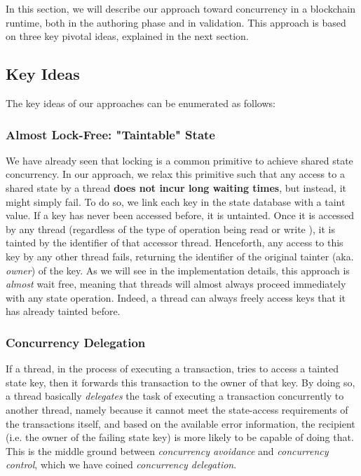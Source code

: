 In this section, we will describe our approach toward concurrency in a blockchain runtime, both in
the authoring phase and in validation. This approach is based on three key pivotal ideas, explained
in the next section.

\subsection{Key Ideas}

The key ideas of our approaches can be enumerated as follows:

\subsubsection{Almost Lock-Free: "Taintable" State}\label{chapt_approach:subsubsec:taintable_state}

We have already seen that locking is a common primitive to achieve shared state concurrency. In our
approach, we relax this primitive such that any access to a shared state by a thread \textbf{does
not incur long waiting times}, but instead, it might simply fail. To do so, we link each key in the
state database with a taint value. If a key has never been accessed before, it is untainted. Once it
is accessed by any thread (regardless of the type of operation being read or write ), it is tainted by the identifier of that
accessor thread. Henceforth, any access to this key by any other thread fails, returning the
identifier of the original tainter (aka. \textit{owner}) of the key. As we will see in the
implementation details, this approach is \textit{almost} wait free, meaning that threads will almost
always proceed immediately with any state operation. Indeed, a thread can always freely access keys
that it has already tainted before.

\subsubsection{Concurrency Delegation}

If a thread, in the process of executing a transaction, tries to access a tainted state key, then it
forwards this transaction to the owner of that key. By doing so, a thread basically
\textit{delegates} the task of executing a transaction concurrently to another thread, namely
because it cannot meet the state-access requirements of the transactions itself, and based on the
available error information, the recipient (i.e. the owner of the failing state key) is more likely
to be capable of doing that. This is the middle ground between \textit{concurrency avoidance} and
\textit{concurrency control}, which we have coined \textit{concurrency delegation}.

